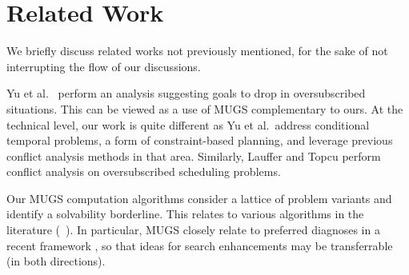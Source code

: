 \section{Related Work}
\label{related}



We briefly discuss related works not previously mentioned, for the
sake of not interrupting the flow of our discussions.

Yu et al.\  perform an analysis suggesting
goals to drop in oversubscribed situations. This can be viewed as a
use of MUGS complementary to ours. At the technical level, our work is
quite different as Yu et al.\ address conditional temporal problems, a
form of constraint-based planning, and leverage previous conflict
analysis methods in that area. Similarly, Lauffer and Topcu
 perform conflict analysis on
oversubscribed scheduling problems.

Our MUGS computation algorithms consider a lattice of problem variants
and identify a solvability borderline. This relates to various
algorithms in the literature
(\eg\ \cite{dekleer:ai-86:atms,reiter:ai-87}). In particular, MUGS
closely relate to preferred diagnoses in a recent framework
\cite{grastien:etal:kr-12}, so that ideas for search enhancements may
be transferrable (in both directions).



